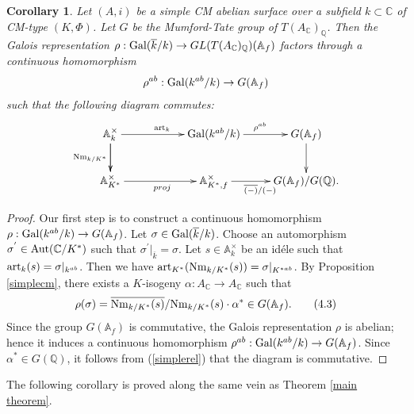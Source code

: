 \documentclass[reqno,a4paper,11pt]{amsart}
\newtheorem{cor}[dfn]{Corollary}
\theoremstyle{definition}
\theoremstyle{definition}
\begin{document}
      \begin{cor}
          Let $(A, i)$ be a simple CM  abelian surface over a subfield $k\subset\mathbb{C}$ of CM-type $(K, \Phi)$. Let $G$ be the Mumford-Tate group of $T(A_{\mathbb{C}})_{\mathbb{Q}}$. Then the Galois representation $\rho:{\rm Gal}(\overline{k}/k)\to GL(T(A_{\mathbb{C}})_{\mathbb{Q}})(\mathbb{A}_{f})$ factors through  a continuous homomorphism
          \begin{align}
              \rho^{ab}: {\rm Gal}(k^{ab}/k)\to G(\mathbb{A}_{f})
         \notag  \end{align}
         such that the following diagram commutes:
         \begin{align}
            \xymatrix{ \mathbb{A}^{\times}_{k}\ar[d]_{{\rm Nm}_{k/K^{\ast}}}\ar[rr]^{{\rm art}_{k}}\ar[d]&&{\rm Gal}(k^{ab}/k)\ar[r]^{\rho^{ab}}& G(\mathbb{A}_{f})\ar[d]
          \\ \mathbb{A}^{\times}_{K^{\ast}}\ar[rr]_{proj}&&\mathbb{A}^{\times}_{K^{\ast}, f}\ar[r]_{\overline{(-)}/(-)}&G(\mathbb{A}_{f})/G(\mathbb{Q}).} \notag
         \end{align} 
      \end{cor}
      \begin{proof}Our first step is to construct a continuous homomorphism $\rho: {\rm Gal}(k^{ab}/k)\to G(\mathbb{A}_{f})$. Let $\sigma\in{\rm Gal}(\overline{k}/k)$. Choose an automorphism $\sigma^{'}\in {\rm Aut}(\mathbb{C}/K^{\ast})$ such that  $\sigma^{'}|_{\overline{k}}=\sigma$. Let $s\in \mathbb{A}^{\times}_{k}$ be an id\'ele such that ${\rm art}_{k}(s)=\sigma|_{k^{ab}}$. Then we have ${\rm art}_{K^{\ast}}({\rm Nm}_{k/K^{\ast}}(s))=\sigma|_{K^{\ast ab}}$. By Proposition \ref{simplecm}, there exists a $K$-isogeny $\alpha:A_{\mathbb{C}}\to A_{\mathbb{C}}$ such that \begin{align}\label{simplerel}\rho(\sigma)=\overline{{\rm Nm}_{k/K^{\ast}}(s)}/{\rm Nm}_{k/K^{\ast}}(s)\cdot\alpha^{\ast}\in G(\mathbb{A}_{f}).\tag{4.3}\end{align} 
      Since the group $G(\mathbb{A}_{f})$ is commutative, the Galois representation $\rho$ is abelian; hence  it induces a continuous homomorphism $\rho^{ab}:{\rm Gal}(k^{ab}/k)\to G(\mathbb{A}_{f})$. Since $\alpha^{\ast}\in G(\mathbb{Q})$, it follows from (\ref{simplerel}) that the diagram is commutative. 
      \end{proof}
      The following corollary is proved along the same vein as Theorem \ref{main theorem}.
\end{document}
